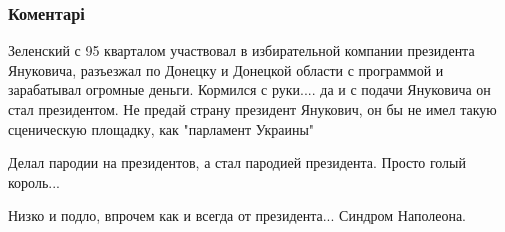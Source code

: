  
 
 
 
 
\subsubsection{Коментарі}
\label{sec:25_08_2021.fb.olejnik_vladimir.5.belyje_pjatna.cmt}

\begin{itemize}
 

Зеленский с 95 кварталом участвовал в избирательной компании президента
Януковича, разъезжал по Донецку и Донецкой области с программой и зарабатывал
огромные деньги. Кормился с руки.... да и с подачи Януковича он стал
президентом. Не предай страну президент Янукович, он бы не имел такую
сценическую площадку, как "парламент Украины"


 
Делал пародии на президентов, а стал пародией президента. Просто голый король...

 
Низко и подло, впрочем как и всегда от президента... Синдром Наполеона.

 

\end{itemize}
